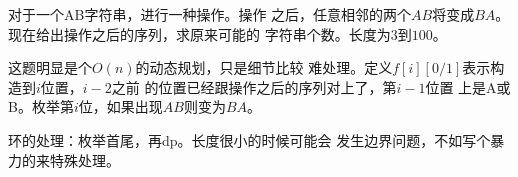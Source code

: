 \begin{prob}
	对于一个AB字符串，进行一种操作。操作
	之后，任意相邻的两个$AB$将变成$BA$。
	现在给出操作之后的序列，求原来可能的
	字符串个数。长度为$3$到$100$。
\end{prob}

\begin{sol}
	这题明显是个$O(n)$的动态规划，只是细节比较
	难处理。定义$f[i][0/1]$表示构造到$i$位置，$i-2$之前
	的位置已经跟操作之后的序列对上了，第$i-1$位置
	上是A或B。枚举第$i$位，如果出现$AB$则变为$BA$。\par
	环的处理：枚举首尾，再dp。长度很小的时候可能会
	发生边界问题，不如写个暴力的来特殊处理。
\end{sol}
